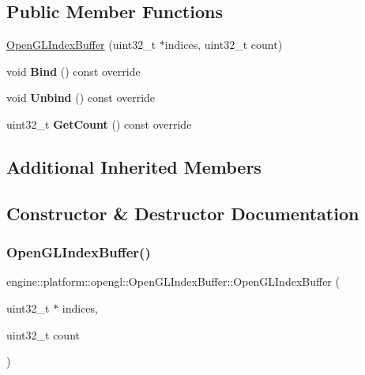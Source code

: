 \subsection*{Public Member Functions}
\begin{DoxyCompactItemize}
\item 
\hyperlink{classengine_1_1platform_1_1opengl_1_1OpenGLIndexBuffer_a88830d5185f3fd37d8274029f8d78746}{Open\+G\+L\+Index\+Buffer} (uint32\+\_\+t $\ast$indices, uint32\+\_\+t count)
\item 
\mbox{\label{classengine_1_1platform_1_1opengl_1_1OpenGLIndexBuffer_ad9279e716132e186a38fe82814f29b0f}} 
void {\bfseries Bind} () const override
\item 
\mbox{\label{classengine_1_1platform_1_1opengl_1_1OpenGLIndexBuffer_a9fc400e4c464a2dbf7df76eba359639e}} 
void {\bfseries Unbind} () const override
\item 
\mbox{\label{classengine_1_1platform_1_1opengl_1_1OpenGLIndexBuffer_a2353743de19ca153e5e1123ef0132952}} 
uint32\+\_\+t {\bfseries Get\+Count} () const override
\end{DoxyCompactItemize}
\subsection*{Additional Inherited Members}


\subsection{Constructor \& Destructor Documentation}
\mbox{\label{classengine_1_1platform_1_1opengl_1_1OpenGLIndexBuffer_a88830d5185f3fd37d8274029f8d78746}} 
\subsubsection{\texorpdfstring{Open\+G\+L\+Index\+Buffer()}{OpenGLIndexBuffer()}}
{\footnotesize\ttfamily engine\+::platform\+::opengl\+::\+Open\+G\+L\+Index\+Buffer\+::\+Open\+G\+L\+Index\+Buffer (\begin{DoxyParamCaption}\item[{uint32\+\_\+t $\ast$}]{indices,  }\item[{uint32\+\_\+t}]{count }\end{DoxyParamCaption})}

